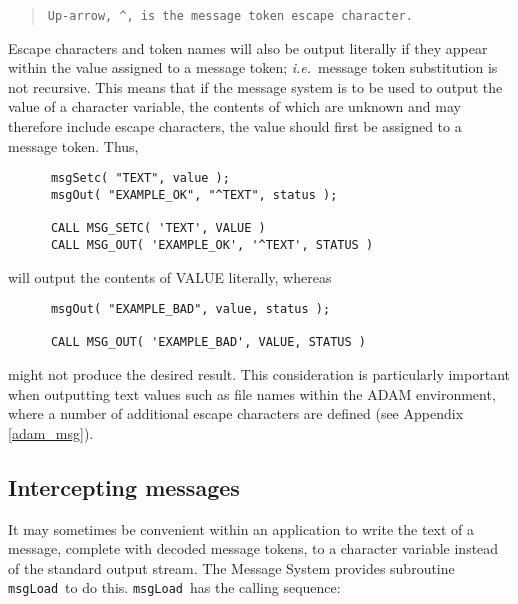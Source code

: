 \documentclass[twoside,11pt]{article}
\newcommand{\htmlref}[2]{#1}
\newcommand{\latex}[1]{#1}
\newcommand{\xlabel}[1]{}
\renewcommand{\_}{\texttt{\symbol{95}}}
\newcommand{\func}[1]{\texttt{#1}}
\newcommand{\msgload}{\func{msgLoad}}
\begin{document}
\begin {quote}
\begin {small}
\begin{verbatim}
Up-arrow, ^, is the message token escape character.
\end{verbatim}
\end {small}
\end {quote}

Escape characters and token names will also be output literally if they
appear within the value assigned to a message token; \textit{i.e.}\ message token
substitution is not recursive.
This means that if the message system is to be used to output the value of a
character variable, the contents of which are unknown and may therefore
include escape characters, the value should first be assigned to a message
token.
Thus,

\begin {small}
\begin {verbatim}
      msgSetc( "TEXT", value );
      msgOut( "EXAMPLE_OK", "^TEXT", status );

      CALL MSG_SETC( 'TEXT', VALUE )
      CALL MSG_OUT( 'EXAMPLE_OK', '^TEXT', STATUS )
\end{verbatim}
\end {small}

will output the contents of VALUE literally, whereas

\begin {small}
\begin{verbatim}
      msgOut( "EXAMPLE_BAD", value, status );

      CALL MSG_OUT( 'EXAMPLE_BAD', VALUE, STATUS )
\end{verbatim}
\end {small}

might not produce the desired result.
This consideration is particularly important when outputting text values
such as file names
\htmlref{within the ADAM environment}{adam_msg},
where a number of additional escape characters are
defined\latex{ (see Appendix \ref{adam_msg})}.


\subsection{\xlabel{intercepting_messages}Intercepting messages \label{inter_sect}}

It may sometimes be convenient within an application to write the text of a
message, complete with decoded message tokens, to a character variable
instead of the standard output stream.
The Message System provides subroutine \msgload\ to do this.
\msgload\ has the calling sequence:
\end{document}

